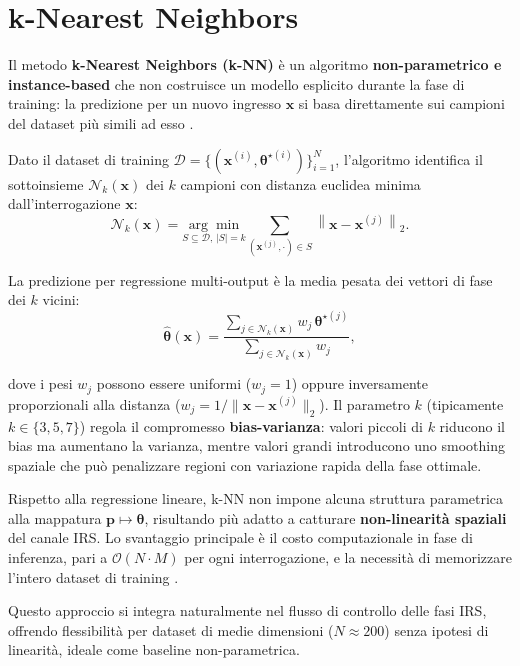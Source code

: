 \documentclass[12pt,a4paper]{report}
\begin{document}
\newpage
\section{k-Nearest Neighbors}
Il metodo \textbf{k-Nearest Neighbors (k-NN)} è un algoritmo
\textbf{non-parametrico e \newline instance-based} che non costruisce
un modello esplicito durante la fase di training: la predizione per
un nuovo ingresso $\mathbf{x}$ si basa direttamente sui campioni del
dataset più simili ad esso \cite{hastie2009esl}.

Dato il dataset di training $\mathcal{D} = \{(\mathbf{x}^{(i)},
\boldsymbol{\theta}^{\star(i)})\}_{i=1}^N$, l'algoritmo identifica il
sottoinsieme $\mathcal{N}_k(\mathbf{x})$ dei $k$ campioni con
distanza euclidea minima dall'interrogazione $\mathbf{x}$:
\begin{equation}
  \mathcal{N}_k(\mathbf{x}) = \underset{S \subseteq \mathcal{D},\,
  |S|=k}{\arg\min}
  \sum_{(\mathbf{x}^{(j)}, \cdot) \in S}
  \left\|\mathbf{x} - \mathbf{x}^{(j)}\right\|_2.
\end{equation}

La predizione per regressione multi-output è la media pesata dei
vettori di fase dei $k$ vicini:
\begin{equation}
  \hat{\boldsymbol{\theta}}(\mathbf{x}) =
  \frac{\sum_{j \in \mathcal{N}_k(\mathbf{x})} w_j\,
  \boldsymbol{\theta}^{\star(j)}}
  {\sum_{j \in \mathcal{N}_k(\mathbf{x})} w_j},
  \label{eq:knn_pred}
\end{equation}

dove i pesi $w_j$ possono essere uniformi ($w_j = 1$) oppure
inversamente proporzionali alla distanza ($w_j =
1/\|\mathbf{x}-\mathbf{x}^{(j)}\|_2$). Il parametro $k$ (tipicamente
$k \in \{3, 5, 7\}$) regola il compromesso \textbf{bias-varianza}:
valori piccoli di $k$ riducono il bias ma aumentano la varianza,
mentre valori grandi introducono uno smoothing spaziale che può
penalizzare regioni con variazione rapida della fase ottimale.

Rispetto alla regressione lineare, k-NN non impone alcuna struttura
parametrica alla mappatura $\mathbf{p} \mapsto \boldsymbol{\theta}$,
risultando più adatto a catturare \textbf{non-linearità spaziali} del
canale IRS. Lo svantaggio principale è il costo computazionale in
fase di inferenza, pari a $\mathcal{O}(N \cdot M)$ per ogni
interrogazione, e la necessità di memorizzare l'intero dataset di
training \cite{hastie2009esl}.

Questo approccio si integra naturalmente nel flusso di controllo
delle fasi IRS, offrendo flessibilità per dataset di medie dimensioni
($N \approx 200$) senza ipotesi di linearità, ideale come baseline
non-parametrica.
\end{document}
